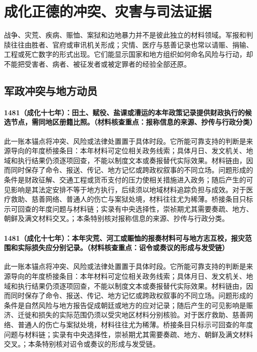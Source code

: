 \section{成化正德的冲突、灾害与司法证据}

战争、灾荒、疾病、赈恤、案狱和边地暴力并不是彼此独立的材料领域。军报和判牍往往由胜者、官府或审讯机关形成；灾情、医疗与慈善记录也常以请赈、捐输、工程或死亡数字的形式出现。它们能显示国家和地方组织如何命名风险与行动，却不能把受害者、病者、被征发者或被定罪者的经验全部还原。

\subsection{军政冲突与地方动员}

\paragraph{1481（成化十七年）：田土、赋役、盐课或漕运的本年政策记录提供财政执行的候选节点，需同地区册籍比照。（材料核查重点：报称信息的来源、抄传与行政分类）} 此一账本锚点将冲突、风险或法律处置置于具体时段。它所能可靠支持的判断是来源导向的年度桥接条目：本年材料可定位相关政务线索；具体月日、发文机关、地域和执行结果仍须逐项回查，不能以制度文本或奏报替代实际效果。材料链由，因而同时保存了命令、报送、传记、地方记忆或跨政权叙事的不同立场。问题形成的条件是财政征解、交通工程或货币支付的压力使相关措施进入政务；随后产生的可见影响是其法定安排不等于地方执行，后续须以地域材料追踪负担与成效。对于医疗救助、慈善网络、普通人的伤亡与案狱处境，材料往往尤为稀薄。桥接条目只标示可回查的年度问题与材料链；实录有中央选择性，崇祯期尤其需要奏疏、地方、朝鲜及满文材料交叉。；本条特别核对报称信息的来源、抄传与行政分类。

\paragraph{1481（成化十七年）：本年灾荒、河工或赈恤的报奏材料可与地方志互校，报灾范围和实际损失应分别记录。（材料核查重点：诏令或奏议的形成与发受链）} 此一账本锚点将冲突、风险或法律处置置于具体时段。它所能可靠支持的判断是来源导向的年度桥接条目：本年材料可定位相关政务线索；具体月日、发文机关、地域和执行结果仍须逐项回查，不能以制度文本或奏报替代实际效果。材料链由，因而同时保存了命令、报送、传记、地方记忆或跨政权叙事的不同立场。问题形成的条件是自然风险与地方报告促成朝廷或地方的应对记录；随后产生的可见影响是赈济、迁徙和损失的实际范围仍须以受灾地区材料分别核验。对于医疗救助、慈善网络、普通人的伤亡与案狱处境，材料往往尤为稀薄。桥接条目只标示可回查的年度问题与材料链；实录有中央选择性，崇祯期尤其需要奏疏、地方、朝鲜及满文材料交叉。；本条特别核对诏令或奏议的形成与发受链。

